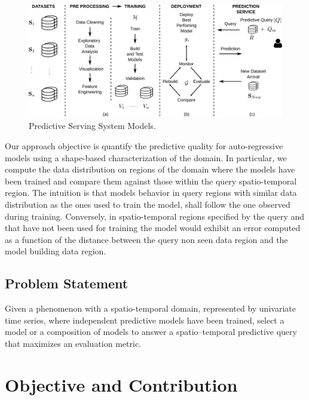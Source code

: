 \begin{figure}[h]
	\centering
	\includegraphics[scale=0.3]{../Figures/ModelManagementPS-VersionCompleta}
	\caption{Predictive Serving System Models.}
	\label{Fig:MotiPoster}
\end{figure}

Our approach objective is quantify the predictive quality for auto-regressive models using a shape-based characterization of the domain. 
In particular, we compute the data distribution on regions of the domain where the models have been trained and compare them against those within the query spatio-temporal region. The intuition is that models behavior in query regions with similar data distribution as the ones used to train the model, shall follow the one observed during training. Conversely, in spatio-temporal regions specified by the query and that have not been used for training the model would exhibit an error computed as a function of the distance between the query non seen data region and the model building data region.

\subsection{Problem Statement}
\label{Sec:ProblemStatement}

Given a phenomenon with a spatio-temporal domain, represented by univariate time series, where independent predictive models have been trained, select a model or a composition of models to answer a spatio--temporal predictive query that maximizes an evaluation metric.

\section{Objective and Contribution}
\label{Sec:ObjectiveContribution}

